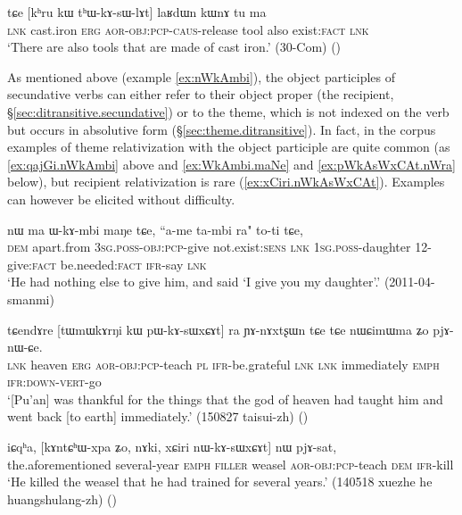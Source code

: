 \begin{exe}
\ex \label{ex:khru.kW.thWkAsWlAt}
\gll tɕe [kʰru kɯ tʰɯ-kɤ-sɯ-lɤt] laʁdɯn kɯnɤ tu ma\\
\textsc{lnk} cast.iron \textsc{erg} \textsc{aor}-\textsc{obj}:\textsc{pcp}-\textsc{caus}-release tool also exist:\textsc{fact} \textsc{lnk}\\
\glt `There are also tools that are made of cast iron.' (30-Com)
()
\end{exe}

As mentioned above (example \ref{ex:nWkAmbi}), the object participles of secundative verbs can either refer to their object proper (the recipient, §\ref{sec:ditransitive.secundative}) or to the theme, which is not indexed on the verb but occurs in absolutive form (§\ref{sec:theme.ditransitive}). In fact, in the corpus examples of theme relativization with the object participle are quite common (as \ref{ex:qajGi.nWkAmbi} above and \ref{ex:WkAmbi.maNe} and \ref{ex:pWkAsWxCAt.nWra} below), but recipient relativization is rare (\ref{ex:xCiri.nWkAsWxCAt}). Examples can however be elicited without difficulty.

\begin{exe}
\ex \label{ex:WkAmbi.maNe}
\gll nɯ ma ɯ-kɤ-mbi maŋe tɕe, ``a-me ta-mbi ra" to-ti tɕe, \\
\textsc{dem} apart.from \textsc{3sg}.\textsc{poss}-\textsc{obj}:\textsc{pcp}-give not.exist:\textsc{sens} \textsc{lnk} \textsc{1sg}.\textsc{poss}-daughter 1\fl{}2-give:\textsc{fact}  be.needed:\textsc{fact} \textsc{ifr}-say \textsc{lnk} \\
\glt `He had nothing else to give him, and said `I give you my daughter'.' (2011-04-smanmi)
\end{exe}

\begin{exe}
\ex \label{ex:pWkAsWxCAt.nWra}
\gll   tɕendɤre [tɯmɯkɤrŋi kɯ pɯ-kɤ-sɯxɕɤt] ra ɲɤ-nɤxtʂɯn tɕe tɕe nɯɕimɯma ʑo pjɤ-nɯ-ɕe. \\
\textsc{lnk} heaven \textsc{erg} \textsc{aor}-\textsc{obj}:\textsc{pcp}-teach \textsc{pl} \textsc{ifr}-be.grateful \textsc{lnk} \textsc{lnk} immediately \textsc{emph} \textsc{ifr}:\textsc{down}-\textsc{vert}-go \\
\glt `[Pu'an] was thankful for the things that the god of heaven had taught him and went back [to earth] immediately.' (150827 taisui-zh)
()
\end{exe}

\begin{exe}
\ex \label{ex:xCiri.nWkAsWxCAt}
\gll    iɕqʰa, [kɤntɕʰɯ-xpa ʑo, nɤki, xɕiri nɯ-kɤ-sɯxɕɤt] nɯ pjɤ-sat, \\
 the.aforementioned several-year \textsc{emph} \textsc{filler} weasel \textsc{aor}-\textsc{obj}:\textsc{pcp}-teach \textsc{dem} \textsc{ifr}-kill \\
\glt `He killed the weasel that he had trained for several years.'  (140518 xuezhe he huangshulang-zh)
()
\end{exe}

